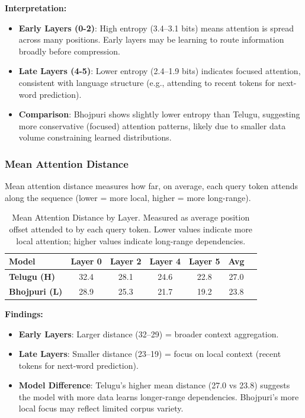 \documentclass[11pt,a4paper]{article}
\begin{document}
\textbf{Interpretation:}
\begin{itemize}
    \item \textbf{Early Layers (0-2)}: High entropy (3.4–3.1 bits) means attention is spread across many positions. Early layers may be learning to route information broadly before compression.
    \item \textbf{Late Layers (4-5)}: Lower entropy (2.4–1.9 bits) indicates focused attention, consistent with language structure (e.g., attending to recent tokens for next-word prediction).
    \item \textbf{Comparison}: Bhojpuri shows slightly lower entropy than Telugu, suggesting more conservative (focused) attention patterns, likely due to smaller data volume constraining learned distributions.
\end{itemize}

\subsubsection{Mean Attention Distance}

Mean attention distance measures how far, on average, each query token attends along the sequence (lower = more local, higher = more long-range).

\begin{table}[H]
\centering
\begin{tabular}{l|cccccc}
\toprule
\textbf{Model} & \textbf{Layer 0} & \textbf{Layer 2} & \textbf{Layer 4} & \textbf{Layer 5} & \textbf{Avg} \\
\midrule
\textbf{Telugu (H)} & 32.4 & 28.1 & 24.6 & 22.8 & 27.0 \\
\textbf{Bhojpuri (L)} & 28.9 & 25.3 & 21.7 & 19.2 & 23.8 \\
\bottomrule
\end{tabular}
\caption{Mean Attention Distance by Layer. Measured as average position offset attended to by each query token. Lower values indicate more local attention; higher values indicate long-range dependencies.}
\end{table}

\textbf{Findings:}
\begin{itemize}
    \item \textbf{Early Layers}: Larger distance (32–29) = broader context aggregation.
    \item \textbf{Late Layers}: Smaller distance (23–19) = focus on local context (recent tokens for next-word prediction).
    \item \textbf{Model Difference}: Telugu's higher mean distance (27.0 vs 23.8) suggests the model with more data learns longer-range dependencies. Bhojpuri's more local focus may reflect limited corpus variety.
\end{itemize}
\end{document}
